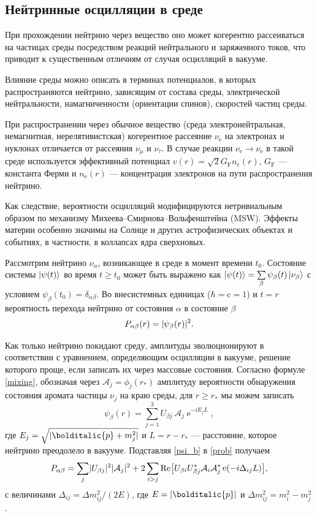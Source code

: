 \documentclass[12pt]{article}
\newcommand\Vect[1]{\bolditalic{#1}}
\DeclareMathOperator{\Exp}{e}
\DeclarePairedDelimiter{\abs}{\lvert}{\rvert}
\renewcommand\exp\Exp
\begin{document}
\subsection*{Нейтринные осцилляции в среде}

При прохождении нейтрино через вещество оно может когерентно рассеиваться на
частицах среды посредством реакций нейтрального и заряженного токов, что
приводит к существенным отличиям от случая осцилляций в вакууме.

Влияние среды можно описать в терминах потенциалов, в которых распространяются
нейтрино, зависящим от состава среды, электрической нейтральности,
намагниченности (ориентации спинов), скоростей частиц среды.

При распространении через обычное вещество (среда электронейтральная,
немагнитная, нерелятивистская) когерентное рассеяние $\nu_{\text{e}}$ на
электронах и нуклонах отличается от рассеяния $\nu_{\mu}$ и $\nu_{\tau}$. В
случае реакции $\nu_{\text{e}}\to\nu_{\text{e}}$ в такой среде используется
эффективный потенциал $v(r)=\sqrt{2}G_{\text{F}}n_e(r)$, $G_{\text{F}}$ —
константа Ферми и $n_{\text{e}}(r)$ — концентрация электронов на пути
распространения нейтрино.

Как следствие, вероятности осцилляций модифицируются нетривиальным образом по
механизму Михеева–Смирнова–Вольфенштейна (MSW). Эффекты материи особенно значимы
на Солнце и других астрофизических объектах и событиях, в частности, в коллапсах
ядра сверхновых.

Рассмотрим нейтрино $\nu_\alpha$, возникающее в среде в момент времени
$t_0$. Состояние системы $\ket{\psi(t)}$ во время $t\geqslant t_0$ может быть
выражено как $\ket{\psi(t)}=\sum\limits_\beta \psi_\beta(t)\ket{\nu_\beta}$ с условием
$\psi_\beta(t_0)=\delta_{\alpha\beta}$. Во внесистемных единицах
($\hbar=\text{c}=1$) и $t=r$ вероятность перехода нейтрино от состояния $\alpha$
в состояние $\beta$
\begin{equation}\label{prob}
  P_{\alpha\beta}(r)=\abs{\psi_\beta(r)}^2.
\end{equation}

Как только нейтрино покидают среду, амплитуды эволюционируют в соответствии с
уравнением, определяющим осцилляции в вакууме, решение которого проще, если
записать их через массовые состояния. Согласно формуле \eqref{mixing}, обозначая
через $\mathcal{A}_j=\phi_j(r_*)$ амплитуду вероятности обнаружения состояния
аромата частицы $\nu_j$ на краю среды, для $r \geqslant r_*$ мы можем записать
\begin{equation}\label{psi_b}
  \psi_\beta(r)=\sum_{j=1}^3 U_{\beta j}\, \mathcal{A}_j \exp^{-iE_jL},
\end{equation}
где $E_j=\sqrt{\abs{\Vect{p} + m^2_j}}$ и $L=r-r_*$ — расстояние, которое нейтрино
преодолело в вакууме. Подставляя \eqref{psi_b} в \eqref{prob} получаем
\begin{equation}
  P_{\alpha\beta}=\sum_j \abs{U_{\beta j}}^2\abs{\mathcal{A}_j}^2+
  2\sum_{i>j}\text{Re}\big[U_{\beta i}U^*_{\beta j}\mathcal{A}_i
  \mathcal{A}^*_j\exp(-i\Delta_{ij}L)\big],
\end{equation}
с величинами $\Delta_{ij}=\Delta m^2_{ij}/(2E)$, где $E=\abs{\Vect{p}}$ и
$\Delta m^2_{ij} \!= m^2_{i} - m^2_{j}$.
\end{document}
